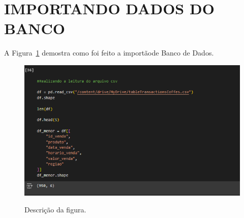 \section{IMPORTANDO DADOS DO BANCO}
	\label{sec:identificao}
\label{sec:figura}
A Figura~\ref{figuras/configuraçao-introduçao.png} demostra como foi feito a importãode Banco de Dados.
\begin{figure}[!ht]
	{\centering
		\caption{Descrição da figura.}
		\includegraphics[width=1.0\textwidth]{figuras/configuraçao-dados.png}
		\label{figuras/configuraçao-introduçao.png}
	}
\end{figure} \\ \\ \\ \\ \\ \\ \\  \\ \\ \\ \\ \\ 


